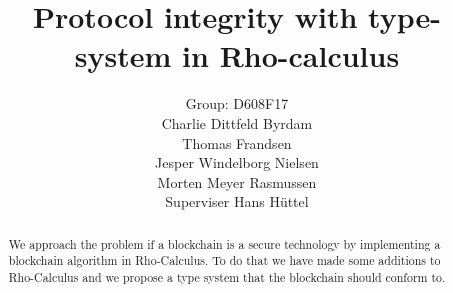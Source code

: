 \mainmatter  %

\title{Protocol integrity with type-system in Rho-calculus}




\author{Group: D608F17\\Charlie Dittfeld Byrdam\\Thomas Frandsen\\Jesper Windelborg Nielsen\\Morten Meyer Rasmussen\\Superviser Hans Hüttel}




\toctitle{}
\tocauthor{}
\maketitle
\clearpage
\begin{abstract}
We approach the problem if a blockchain is a secure technology by implementing a blockchain algorithm in Rho-Calculus. To do that we have made some additions to Rho-Calculus and we propose a type system that the blockchain should conform to. 
\end{abstract}
